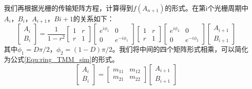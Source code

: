 我们再根据光栅的传输矩阵方程，计算得到$f(A_{n+1})$的形式。在第i个光栅周期中$A_i$，$B_i$，$A_{i+1}$，$B{i+1}$的关系如下：
\begin{equation}
\label{Equ:ithTMM}
\begin{bmatrix}
A_{i}\\
B_{i}
\end{bmatrix} 
=
\frac{1}{1-r^2}
\begin{bmatrix}
1 & r\\
r & 1
\end{bmatrix}
\begin{bmatrix}
e^{i\phi_1} & 0 \\
0 & e^{-i\phi_1}
\end{bmatrix}
\begin{bmatrix}
1 & r\\
r & 1
\end{bmatrix}
\begin{bmatrix}
e^{i\phi_2} & 0 \\
0 & e^{-i\phi_2}
\end{bmatrix}
\begin{bmatrix}
A_{i+1}\\
B_{i+1}
\end{bmatrix} 
\end{equation}
其中$\phi_1=D\pi/2$，$\phi_2=(1-D)\pi/2$。我们将中间的四个矩阵形式相乘，可以简化为公式\ref{Equ:ring_TMM_sim}的形式。
\begin{equation}
\label{Equ:ring_TMM_sim}
\begin{bmatrix}
A_{i}\\
B_{i}
\end{bmatrix} 
=
\begin{bmatrix}
m_{11} & m_{12}\\
m_{21} & m_{22}
\end{bmatrix}
\begin{bmatrix}
A_{i+1}\\
B_{i+1}
\end{bmatrix}
\end{equation}

